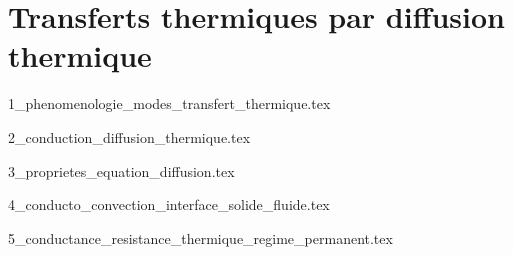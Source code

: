 \chapter{Transferts thermiques par diffusion thermique}

\minitoc 

{1_phenomenologie_modes_transfert_thermique.tex}

{2_conduction_diffusion_thermique.tex}

{3_proprietes_equation_diffusion.tex}

{4_conducto_convection_interface_solide_fluide.tex}

{5_conductance_resistance_thermique_regime_permanent.tex}